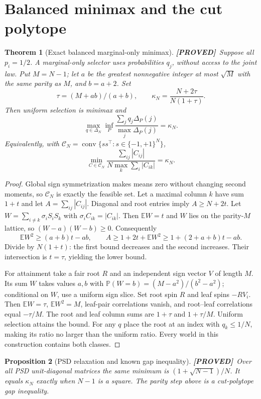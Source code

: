 \documentclass[11pt]{article}
\newtheorem{theorem}{Theorem}[section]
\newtheorem{proposition}[theorem]{Proposition}
\theoremstyle{definition}
\newcommand{\E}{\mathbb E}
\newcommand{\Pp}{\mathbb P}
\newcommand{\1}{\mathbf 1}
\newcommand{\pr}{\textbf{[PROVED]}}
\DeclareMathOperator{\conv}{conv}
\begin{document}
\section{Balanced minimax and the cut polytope}
\begin{theorem}[Exact balanced marginal-only minimax]\label{th:kappa}
\pr\ Suppose all $p_i=1/2$. A marginal-only selector uses probabilities
$q_j$, without access to the joint law. Put $M=N-1$; let $a$ be the greatest
nonnegative integer at most $\sqrt M$ with the same parity as $M$, and $b=a+2$.
Set
\[
 \tau=(M+ab)/(a+b),\qquad \kappa_N=\frac{N+2\tau}{N(1+\tau)}.
\]
Then uniform selection is minimax and
\[
 \max_{q\in\Delta_N}\inf_P
 \frac{\sum_jq_j\Delta_P(j)}{\max_j\Delta_P(j)}=\kappa_N.
\]
Equivalently, with $\mathcal C_N=\conv\{ss^\top:s\in\{-1,+1\}^N\}$,
\[
 \min_{C\in\mathcal C_N}
 \frac{\sum_{ij}|C_{ij}|}{N\max_k\sum_i|C_{ik}|}=\kappa_N.
\]
\end{theorem}
\begin{proof}
Global sign symmetrization makes means zero without changing second moments,
so $\mathcal C_N$ is exactly the feasible set. Let a maximal column $k$ have
sum $1+t$ and let $A=\sum_{ij}|C_{ij}|$. Diagonal and root entries imply
$A\ge N+2t$. Let $W=\sum_{i\ne k}\sigma_iS_iS_k$ with
$\sigma_iC_{ik}=|C_{ik}|$. Then $\E W=t$ and $W$ lies on the parity-$M$
lattice, so $(W-a)(W-b)\ge0$. Consequently
\[
 \E W^2\ge(a+b)t-ab,\qquad
 A\ge1+2t+\E W^2\ge1+(2+a+b)t-ab.
\]
Divide by $N(1+t)$: the first bound decreases and the second increases.
Their intersection is $t=\tau$, yielding the lower bound.

For attainment take a fair root $R$ and an independent sign vector $V$ of
length $M$. Its sum $W$ takes values $a,b$ with
$\Pp(W=b)=(M-a^2)/(b^2-a^2)$; conditional on $W$, use a uniform sign slice.
Set root spin $R$ and leaf spins $-RV_i$. Then $\E W=\tau$, $\E W^2=M$,
leaf-pair correlations vanish, and root--leaf correlations equal $-\tau/M$.
The root and leaf column sums are $1+\tau$ and $1+\tau/M$.
Uniform selection attains the bound. For any $q$ place the root at an index
with $q_k\le1/N$, making its ratio no larger than the uniform ratio.
Every world in this construction contains both classes.
\end{proof}
\begin{proposition}[PSD relaxation and known gap inequality]\label{prop:psd}
\pr\ Over all PSD unit-diagonal matrices the same minimum is
$(1+\sqrt{N-1})/N$. It equals $\kappa_N$ exactly when $N-1$ is a square.
The parity step above is a cut-polytope gap inequality.
\end{proposition}
\end{document}

